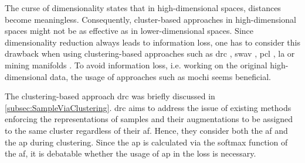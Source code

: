 The curse of dimensionality states that in high-dimensional spaces, distances become meaningless.
Consequently, cluster-based approaches in high-dimensional spaces might not be as effective as in lower-dimensional spaces.
Since dimensionality reduction always leads to information loss, 
one has to consider this drawback when using clustering-based approaches 
such as \ac{drc} \citep{DRC_2020}, \ac{swav} \citep{swav_2020}, \ac{pcl} \citep{PCL_2021}, 
\ac{la} \citep{local_aggr_2019} or mining manifolds \citep{mining_manifolds_2018}.
To avoid information loss, i.e. working on the original high-dimensional data, 
the usage of approaches such as \ac{mochi} \citep{mochi_2020} seems beneficial.

The clustering-based approach \ac{drc} \citep{DRC_2020} was briefly discussed in \autoref{subsec:SampleViaClustering}.
\ac{drc} aims to address the issue of existing methods enforcing the representations of samples 
and their augmentations to be assigned to the same cluster regardless of their \ac{af}.
Hence, they consider both the \ac{af} and the \ac{ap} during clustering.
Since the \ac{ap} is calculated via the softmax function of the \ac{af}, 
it is debatable whether the usage of \ac{ap} in the loss is necessary.